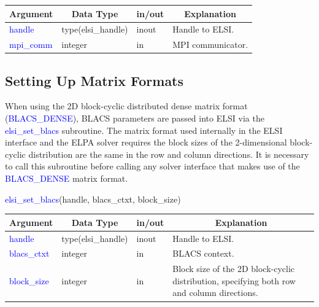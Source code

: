 \documentclass{report}
\begin{document}
\begin{tabular}[]{|p{30mm}|p{30mm}|p{15mm}|p{90mm}|}
\hline
\multicolumn{1}{|c|}{\textbf{Argument}} & \multicolumn{1}{c|}{\textbf{Data Type}} & \multicolumn{1}{c|}{\textbf{in/out}} & \multicolumn{1}{c|}{\textbf{Explanation}}\\
\hline
\textcolor{blue}{handle}    & type(elsi\_handle) & inout & Handle to ELSI.\\
\hline
\textcolor{blue}{mpi\_comm} & integer            & in    & MPI communicator.\\
\hline
\end{tabular}

\subsection{Setting Up Matrix Formats}
\label{subsec:setup_matrix}
When using the 2D block-cyclic distributed dense matrix format (\textcolor{blue}{BLACS\_DENSE}), BLACS parameters are passed into ELSI via the \textcolor{blue}{elsi\_set\_blacs} subroutine.  The matrix format used internally in the ELSI interface and the ELPA solver requires the block sizes of the 2-dimensional block-cyclic distribution are the same in the row and column directions.  It is necessary to call this subroutine before calling any solver interface that makes use of the \textcolor{blue}{BLACS\_DENSE} matrix format.\\

\begin{labeling}{\hspace{6cm}}
\item [\hspace{0.3cm} \textcolor{blue}{elsi\_set\_blacs}(handle, blacs\_ctxt, block\_size)]
\end{labeling}

\begin{tabular}[]{|p{30mm}|p{30mm}|p{15mm}|p{90mm}|}
\hline
\multicolumn{1}{|c|}{\textbf{Argument}} & \multicolumn{1}{c|}{\textbf{Data Type}} & \multicolumn{1}{c|}{\textbf{in/out}} & \multicolumn{1}{c|}{\textbf{Explanation}}\\
\hline
\textcolor{blue}{handle}      & type(elsi\_handle) & inout & Handle to ELSI.\\
\hline
\textcolor{blue}{blacs\_ctxt} & integer            & in    & BLACS context.\\
\hline
\textcolor{blue}{block\_size} & integer            & in    & Block size of the 2D block-cyclic distribution, specifying both row and column directions. \\
\hline
\end{tabular}
\end{document}
